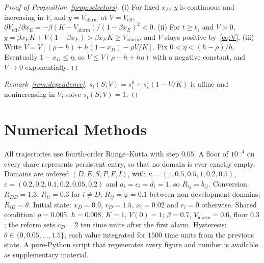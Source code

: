 \documentclass[letterpaper]{article} %
\theoremstyle{definition}
\begin{document}
\begin{proof}[Proof of Proposition~\ref{prop:selectors}]
(i) For fixed $x_E$, $y$ is continuous and increasing in $V$, and $y=V_{\mathrm{alarm}}$ at $V=V_{\mathrm{eff}}$; $\partial V_{\mathrm{eff}}/\partial x_E=-\beta(K-V_{\mathrm{alarm}})/(1-\beta x_E)^2<0$. (ii) For $t\ge t_1$ and $V>0$, $y=\beta x_EK+V(1-\beta x_E)>\beta x_EK\ge V_{\mathrm{alarm}}$, and $V$ stays positive by~\eqref{eq:V}. (iii) Write $\dot V=V[(\rho-h)+h(1-x_D)-\rho V/K]$. Fix $0<\eta<(h-\rho)/h$. Eventually $1-x_D\le\eta$, so $\dot V\le V(\rho-h+h\eta)$ with a negative constant, and $V\to0$ exponentially.
\end{proof}

\begin{proof}[Remark~\ref{rem:dependence}]
$s_i(S;V)=s^0_i+s^1_i(1-V/K)$ is affine and nonincreasing in $V$; solve $s_i(S;V)=1$.
\end{proof}

\section{Numerical Methods}\label{app:numerics}

All trajectories use fourth-order Runge--Kutta with step $0.05$. A floor of $10^{-4}$ on every share represents persistent entry, so that no domain is ever exactly empty. Domains are ordered $(D,E,S,P,F,I)$, with $\kappa=(1,0.5,0.5,1,0.2,0.5)$, $\varepsilon=(0.2,0.2,0.1,0.2,0.05,0.2)$ and $a_i=c_i=d_i=1$, so $R_{ij}=b_{ij}$. Conversion: $R_{DD}=1.3$; $R_{ii}=0.3$ for $i\ne D$; $R_{ij}=\varphi=0.1$ between non-development domains; $R_{iD}=\theta$. Initial state: $x_D=0.9$, $r_D=1.5$, $x_i=0.02$ and $r_i=0$ otherwise. Shared condition: $\rho=0.005$, $h=0.008$, $K=1$, $V(0)=1$; $\beta=0.7$, $V_{\mathrm{alarm}}=0.6$, floor $0.3$; the reform sets $c_D=2$ ten time units after the first alarm. Hysteresis: $\theta\in\{0,0.05,\dots,1.5\}$, each value integrated for $1500$ time units from the previous state. A pure-Python script that regenerates every figure and number is available as supplementary material.
\end{document}
